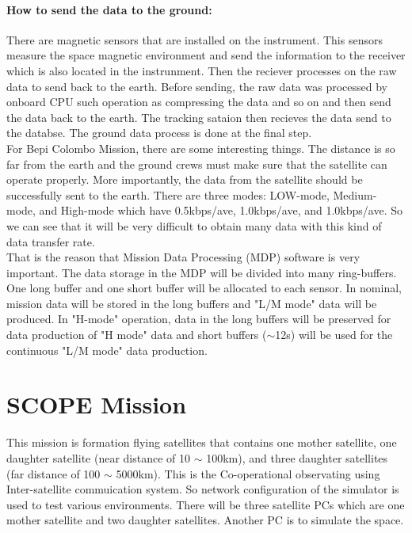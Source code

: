 \paragraph*{How to send the data to the ground:} There are magnetic sensors that are installed on the instrument. This sensors measure the space magnetic environment and send the information to the receiver which is also located in the instrunment. Then the reciever processes on the raw data to send back to the earth. Before sending, the raw data was processed by onboard CPU such operation as compressing the data and so on and then send the data back to the earth. The tracking sataion then recieves the data send to the databse. The ground data process is done at the final step\cite{lecture}.\\
For Bepi Colombo Mission, there are some interesting things. The distance is so far from the earth and the ground crews must make sure that the satellite can operate properly. More importantly, the data from the satellite should be successfully sent to the earth. There are three modes: LOW-mode, Medium-mode, and High-mode which have 0.5kbps/ave, 1.0kbps/ave, and 1.0kbps/ave. So we can see that it will be very difficult to obtain many data with this kind of data transfer rate\cite{lecture}.\\
That is the reason that Mission Data Processing (MDP) software is very important. The data storage in the MDP will be divided into many ring-buffers. One long buffer and one short buffer will be allocated to each sensor. In nominal, mission data will be stored in the long buffers and "L/M mode" data will be produced. In "H-mode" operation, data in the long buffers will be preserved for data production of "H mode" data and short buffers ($\sim$12s) will be used for the continuous "L/M mode" data production\cite{lecture}.\\
\section*{SCOPE Mission}
This mission is formation flying satellites that contains one mother satellite, one daughter satellite (near distance of 10 $\sim$ 100km), and three daughter satellites (far distance of 100 $\sim$ 5000km). This is the Co-operational observating using Inter-satellite commuication system. So network configuration of the simulator is used to test various environments. There will be three satellite PCs which are one mother satellite and two daughter satellites. Another PC is to simulate the space.\\

